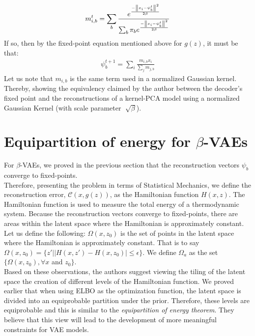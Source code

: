 \begin{gather*}
m_{i,b}^t = \sum_b\frac{e^\frac{-\left\lVert x_i - \psi_b^t\right\rVert^2}{2\beta}}{\sum_b \pi_be^\frac{-\left\lVert x_i-\psi_b^t\right\rVert^2}{2\beta}}
\end{gather*}
If so, then by the fixed-point equation mentioned above for $g(z)$, it must be that:
\begin{gather*}
\psi_b^{t+1} = \sum_i \frac{m_{i,b} x_i}{\sum_j m_{j,b}}
\end{gather*}
Let us note that $m_{i,b}$ is the same term used in a normalized Gaussian kernel. Thereby, showing the equivalency claimed by the author between the decoder's fixed point and the reconstructions of a kernel-PCA model using a normalized Gaussian Kernel (with scale parameter $\sqrt[]{\beta}$).


\section*{Equipartition of energy for $\beta$-VAEs}

For $\beta$-VAEs, we proved in the previous section that the reconstruction vectors $\psi_b$ converge to fixed-points.\\
Therefore, presenting the problem in terms of Statistical Mechanics, we define the reconstruction error, $\mathcal{C}(x, g(z))$, as the Hamiltonian function $H(x,z)$. The Hamiltonian function is used to measure the total energy of a thermodynamic system. Because the reconstruction vectors converge to fixed-points, there are areas within the latent space where the Hamiltonian is approximately constant.\\
Let us define the following: $\Omega(x,z_0)$ is the set of points in the latent space where the Hamiltonian is approximately constant. That is to say $\Omega(x,z_0) = \{z'||H(x,z')-H(x,z_0)|\leq\epsilon\}$. We define $\Omega_a$ as the set $\{\Omega(x,z_0),\forall x$ and $z_0\}$.\\
Based on these observations, the authors suggest viewing the tiling of the latent space the creation of different levels of the Hamiltonian function. We proved earlier that when using ELBO as the optimization function, the latent space is divided into an equiprobable partition under the prior. Therefore, these levels are equiprobable and this is similar to the \textit{equipartition of energy theorem}. They believe that this view will lead to the development of more meaningful constraints for VAE models.
